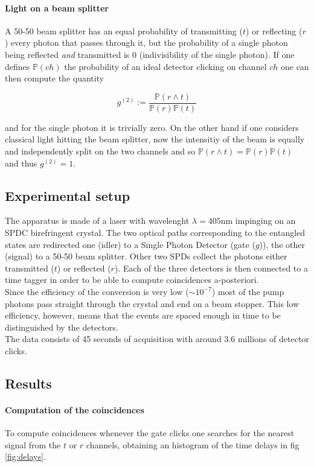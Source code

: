 \documentclass[a4paper, 11pt]{article}
\begin{document}
    \paragraph{Light on a beam splitter}
      A 50-50 beam splitter has an equal probability of transmitting ($t$) or reflecting ($r$) every photon that passes through it, but the probability of a single photon being reflected \emph{and} transmitted is 0 (indivisibility of the single photon). If one defines $\mathbb{P}(ch)$ the probability of an ideal detector clicking on channel $ch$ one can then compute the quantity

      \begin{equation*}
        g^{(2)} := \frac{\mathbb{P}(r \wedge t)}{\mathbb{P}(r)\mathbb{P}(t)}
      \end{equation*}

      and for the single photon it is trivially zero. On the other hand if one considers classical light hitting the beam splitter, now the intensitiy of the beam is equally and independently split on the two channels and so $\mathbb{P}(r \wedge t) = \mathbb{P}(r)\mathbb{P}(t)$ and thus $g^{(2)} = 1$.


  \subsection{Experimental setup}
    The apparatus is made of a laser with wavelenght $\lambda = 405\si{\nano\meter}$ impinging on an SPDC birefringent crystal. The two optical paths corresponding to the entangled states are redirected one (idler) to a Single Photon Detector (gate ($g$)), the other (signal) to a 50-50 beam splitter. Other two SPDs collect the photons either transmitted ($t$) or reflected ($r$). Each of the three detectors is then connected to a time tagger in order to be able to compute coincidences a-posteriori.\\
    Since the efficiency of the conversion is very low ($\sim 10^{-7}$) most of the pump photons pass straight through the crystal and end on a beam stopper. This low efficiency, however, means that the events are spaced enough in time to be distinguished by the detectors.\\
    The data consists of 45 seconds of acquisition with around 3.6 millions of detector clicks.

  \subsection{Results}
    \paragraph{Computation of the coincidences}
      To compute coincidences whenever the gate clicks one searches for the nearest signal from the $t$ or $r$ channels, obtaining an histogram of the time delays in fig \ref{fig:delays}.
\end{document}
